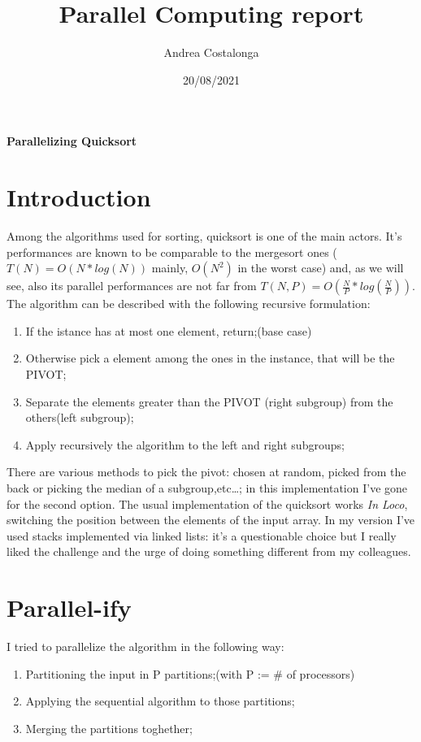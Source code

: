 \documentclass{article}
\title{Parallel Computing report}
\author{Andrea Costalonga}
\date{20/08/2021}
\begin{document}
\maketitle
\textbf{\LARGE Parallelizing Quicksort}
\section{Introduction}
Among the algorithms used for sorting, quicksort is one of the main actors. It's performances 
are known to be comparable to the mergesort ones ($T(N) = O(N*log(N))$ mainly, $O(N^2)$ in the worst case) 
and, as we will see, also its parallel performances are not far from $T(N,P) = O(\frac{N}{P}*log(\frac{N}{P}))$.
\\The algorithm can be described with the following recursive formulation:
\begin{enumerate}
    \item If the istance has at most one element, return;(base case)
    \item Otherwise pick a element among the ones in the instance, that will be the PIVOT;
    \item Separate the elements greater than the PIVOT (right subgroup) from the others(left subgroup);
    \item Apply recursively the algorithm to the left and right subgroups;
\end{enumerate}
There are various methods to pick the pivot: chosen at random, picked from the back or 
picking the median of a subgroup,etc\dots; in this implementation I've gone for the second option.
The usual implementation of the quicksort works \textit{In Loco}, switching the position between the elements
of the input array. In my version I've used stacks implemented via linked lists: it's a questionable choice
but I really liked the challenge and the urge of doing something different from my colleagues.

\section{Parallel-ify}
I tried to parallelize the algorithm in the following way:
\begin{enumerate}
    \item Partitioning the input in P partitions;(with P := \# of processors)
    \item Applying the sequential algorithm to those partitions;
    \item Merging the partitions toghether;
\end{enumerate}
\end{document}
